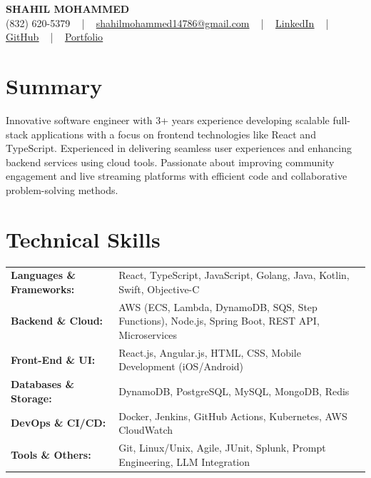 \documentclass[letterpaper,11pt]{article}
\begin{document}
\begin{center}
    {\fontsize{14pt}{12pt}\selectfont \textbf{\MakeUppercase{Shahil Mohammed}}}\\ \vspace{2pt}
    \fontsize{10pt}{12pt}\selectfont (832) 620-5379 ~ | ~ \href{mailto:shahilmohammed14786@gmail.com}{shahilmohammed14786@gmail.com} ~ | ~  
    \href{https://www.linkedin.com/in/shahil-mohammed-9652931a1/}{\color{blue}\underline{LinkedIn}}  ~ | ~ 
    \href{https://github.com/freakbeast14}{\color{blue}\underline{GitHub}} ~ | ~ 
    \href{https://shahil-mohammed.netlify.app/}{\color{blue}\underline{Portfolio}}
    \vspace{-8pt}
\end{center}

\section{Summary}
\fontsize{9pt}{10pt}\selectfont
Innovative software engineer with 3+ years experience developing scalable full-stack applications with a focus on frontend technologies like React and TypeScript. Experienced in delivering seamless user experiences and enhancing backend services using cloud tools. Passionate about improving community engagement and live streaming platforms with efficient code and collaborative problem-solving methods.
\vspace{-5pt}

\section{Technical Skills}
        \vspace{-14pt}
        \begin{table}[h]
            \fontsize{9pt}{10pt}\selectfont
            \begin{tabular}{p{0.3\linewidth} p{0.7\linewidth}}
                \textbf{Languages \& Frameworks:} & React, TypeScript, JavaScript, Golang, Java, Kotlin, Swift, Objective-C \\
                \textbf{Backend \& Cloud:} & AWS (ECS, Lambda, DynamoDB, SQS, Step Functions), Node.js, Spring Boot, REST API, Microservices \\
                \textbf{Front-End \& UI:} & React.js, Angular.js, HTML, CSS, Mobile Development (iOS/Android) \\
                \textbf{Databases \& Storage:} & DynamoDB, PostgreSQL, MySQL, MongoDB, Redis \\
                \textbf{DevOps \& CI/CD:} & Docker, Jenkins, GitHub Actions, Kubernetes, AWS CloudWatch \\
                \textbf{Tools \& Others:} & Git, Linux/Unix, Agile, JUnit, Splunk, Prompt Engineering, LLM Integration \\
            \end{tabular}
        \end{table}
 \vspace{-15pt}
 
\end{document}
